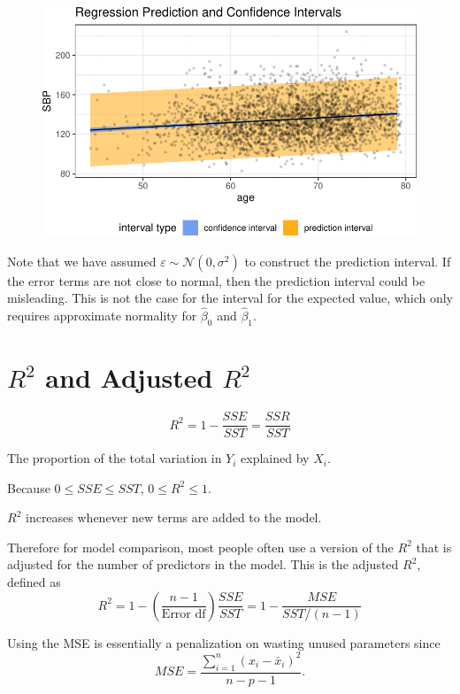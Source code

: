 \documentclass[
  letterpaper,
  DIV=11,
  numbers=noendperiod]{scrreport}
\begin{document}
\begin{figure}[H]

{\centering \includegraphics{week3/week3_files/figure-pdf/unnamed-chunk-10-1.pdf}

}

\end{figure}

Note that we have assumed \(\varepsilon \sim \mathcal N(0, \sigma^2)\)
to construct the prediction interval. If the error terms are not close
to normal, then the prediction interval could be misleading. This is not
the case for the interval for the expected value, which only requires
approximate normality for \(\hat \beta_0\) and \(\hat \beta_1\).

\hypertarget{r2-and-adjusted-r2}{%
\section{\texorpdfstring{\(R^2\) and Adjusted
\(R^2\)}{R\^{}2 and Adjusted R\^{}2}}\label{r2-and-adjusted-r2}}

\[R^2 = 1 - \frac{SSE}{SST} = \frac{SSR}{SST}\]

The proportion of the total variation in \(Y_i\) explained by \(X_i\).

Because \(0 \leq SSE \leq SST\), \(0 \leq R^2 \leq 1\).

\(R^2\) increases whenever new terms are added to the model.

Therefore for model comparison, most people often use a version of the
\(R^2\) that is adjusted for the number of predictors in the model. This
is the {adjusted} \(R^2\), defined as
\[R^2 = 1 - \left( \frac{n-1}{\text{Error df}} \right) \frac{SSE}{SST}  = 1 - \frac{MSE}{SST/(n-1)}\]

Using the MSE is essentially a penalization on wasting unused parameters
since \[MSE = \frac{\sum_{i=1}^n (x_i - \bar x_i)^2}{n - p - 1}.\]
\end{document}

